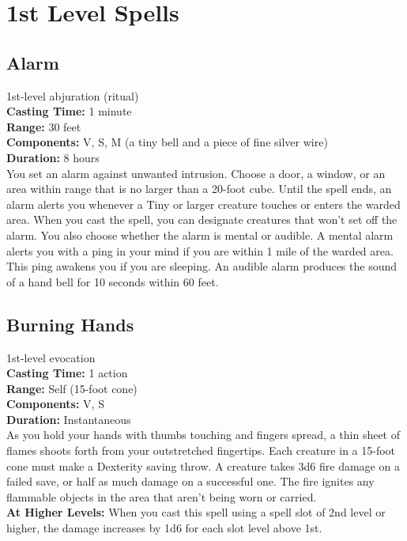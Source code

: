 \documentclass[11pt, A4paper, english]{article}
\begin{document}
	\section{1st Level Spells}
		\subsection{Alarm}
1st-level abjuration (ritual) \\
\textbf{Casting Time:} 1 minute \\
\textbf{Range:} 30 feet \\
\textbf{Components:} V, S, M (a tiny bell and a piece of fine silver wire) \\
\textbf{Duration:} 8 hours \\
You set an alarm against unwanted intrusion. Choose a door, a window, or an area within range that is no larger than a 20-foot cube. Until the spell ends, an alarm alerts you whenever a Tiny or larger creature touches or enters the warded area. When you cast the spell, you can designate creatures that won’t set off the alarm. You also choose whether the alarm is mental or audible. A mental alarm alerts you with a ping in your mind if you are within 1 mile of the warded area. This ping awakens you if you are sleeping. An audible alarm produces the sound of a hand bell for 10 seconds within 60 feet.

		\subsection{Burning Hands}
1st-level evocation \\
\textbf{Casting Time:} 1 action \\
\textbf{Range:} Self (15-foot cone) \\
\textbf{Components:} V, S \\
\textbf{Duration:} Instantaneous \\
As you hold your hands with thumbs touching and fingers spread, a thin sheet of flames shoots forth from your outstretched fingertips. Each creature in a 15-foot cone must make a Dexterity saving throw. A creature takes 3d6 fire damage on a failed save, or half as much damage on a successful one. The fire ignites any flammable objects in the area that aren’t being worn or carried. \\
\textbf{At Higher Levels:} When you cast this spell using a spell slot of 2nd level or higher, the damage increases by 1d6 for each slot level above  1st.
\end{document}
